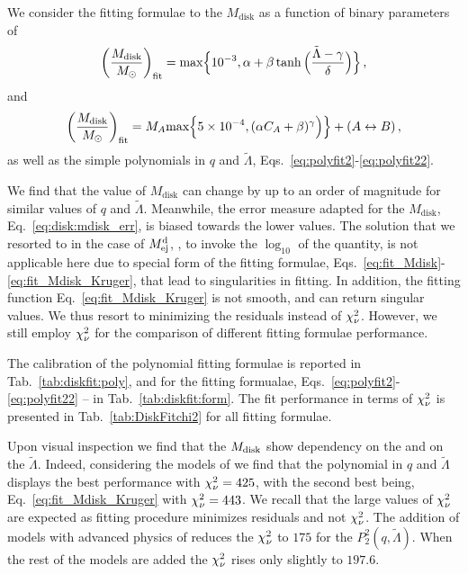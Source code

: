 We consider the fitting formulae to the $M_{\text{disk}}$ as a function of binary parameters of \citet{Radice:2018pdn} 
%
\begin{equation}
\left(\frac{M_{\rm{disk}}}{M_{\odot}}\right)_{\rm fit} = \text{max}\Big\{10^{-3}, \alpha + \beta \tanh\Big(\frac{\tilde{\Lambda}-\gamma}{\delta}\Big)\Big\}\,,
\label{eq:fit_Mdisk}
\end{equation}
%
and \citet{Kruger:2020gig} 
%
\begin{equation}
\left(\frac{M_{\rm{disk}}}{M_{\odot}}\right)_{\rm fit} =
M_A\text{max}\Big\{5\times 10^{-4}, (\alpha C_A + \beta)^\gamma
\Big)\Big\}
+ (A\leftrightarrow B)\, ,
\label{eq:fit_Mdisk_Kruger}
\end{equation}
%
as well as the simple polynomials in $q$ and $\tilde{\Lambda}$, 
Eqs.~\eqref{eq:polyfit2}-\eqref{eq:polyfit22}.


We find that the value of $M_{\text{disk}}$ can change by up to an order of magnitude 
for similar values of $q$ and $\tilde{\Lambda}$. Meanwhile, the error measure adapted for the 
$M_{\text{disk}}$, Eq.~\eqref{eq:disk:mdisk_err}, is biased towards the lower values. 
The solution that we resorted to in the case of $M^{\text{d}}_{\text{ej}}$, \ie, to invoke the $\log_{10}$ of the 
quantity, is not applicable here due to special form of the fitting formulae,  
Eqs.~\eqref{eq:fit_Mdisk}-\eqref{eq:fit_Mdisk_Kruger}, that lead to singularities in fitting.
%
In addition, the fitting function Eq.~\eqref{eq:fit_Mdisk_Kruger} 
is not smooth, and can return singular values.
%
We thus resort to minimizing the residuals instead of $\chi_{\nu}^2$. However, we still 
employ $\chi_{\nu}^2$ for the comparison of different fitting formulae performance. 

The calibration of the polynomial fitting formulae is reported in 
Tab.~\ref{tab:diskfit:poly}, and for the fitting formualae, 
Eqs.~\eqref{eq:polyfit2}-\eqref{eq:polyfit22} -- in Tab.~\ref{tab:diskfit:form}.
The fit performance in terms of $\chi_{\nu}^2$ is presented in Tab.~\ref{tab:DiskFitchi2} for all
fitting formulae. 

Upon visual inspection we find that the $M_{\rm disk}$ show 
dependency on the \mr{} 
and on the $\tilde{\Lambda}$. Indeed, considering the models of \DSrefset{} we find 
that the polynomial in $q$ and $\tilde{\Lambda}$ displays the best performance with 
$\chi_{\nu}^2=425$, with the second best being, Eq.~\eqref{eq:fit_Mdisk_Kruger} with $\chi_{\nu}^2=443$.
We recall that the large values of $\chi_{\nu}^2$ are expected as fitting procedure minimizes 
residuals and not $\chi_{\nu}^2$.
%
The addition of models with advanced physics of \DSheatcool{} reduces the $\chi_{\nu}^2$ to 
$175$ for the $P_2^2(q,\tilde{\Lambda})$. When the rest of the models are added 
the $\chi_{\nu}^2$ rises only slightly to $197.6$.

